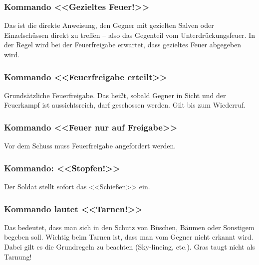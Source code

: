 \subsubsection{Kommando <<Gezieltes Feuer!>>}
Das ist die direkte Anweisung, den Gegner mit gezielten Salven oder Einzelschüssen direkt zu treffen – also das Gegenteil vom Unterdrückungsfeuer. In der Regel wird bei der Feuerfreigabe erwartet, dass gezieltes Feuer abgegeben wird. \\
\subsubsection{Kommando <<Feuerfreigabe erteilt>>}
Grundsätzliche Feuerfreigabe. Das heißt, sobald Gegner in Sicht und der Feuerkampf ist aussichtsreich, darf geschossen werden. Gilt bis zum Wiederruf. \\
\subsubsection{Kommando <<Feuer nur auf Freigabe>>}
Vor dem Schuss muss Feuerfreigabe angefordert werden. \\
\subsubsection{Kommando: <<Stopfen!>>}
Der Soldat stellt sofort das <<Schießen>> ein. \\
\subsubsection{Kommando lautet <<Tarnen!>>}
Das bedeutet, dass man sich in den Schutz von Büschen, Bäumen oder Sonstigem begeben soll. Wichtig beim Tarnen ist, dass man vom Gegner nicht erkannt wird. Dabei gilt es die Grundregeln zu beachten (Sky-lineing, etc.). Gras taugt nicht als Tarnung! \\
